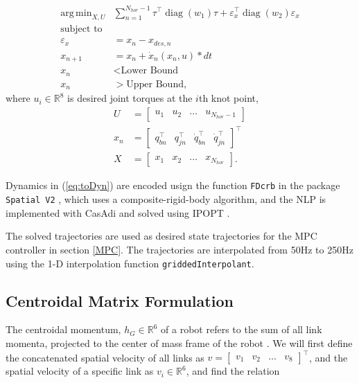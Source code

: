 \documentclass[conference]{IEEEtran}
\DeclareMathOperator*{\argmin}{arg\,min}
\DeclareMathOperator{\diag}{diag}
\begin{document}
\begin{align}
    \argmin_{X, U}& \sum^{N_{hor}-1}_{n=1} \tau^\top \diag(w_1) \tau + \varepsilon_x^\top \diag(w_2) \varepsilon_x \\
     \text{subject to} & \nonumber \\
     \varepsilon_x & = x_n - x_{des, n} \\
    x_{n+1} & =x_n + \dot{x}_n(x_n, u) * dt \label{eq:toDyn}\\
    x_n &< \text{Lower Bound} \\
    x_n &> \text{Upper Bound}, 
\end{align}
where $u_i \in \mathbb{R}^8$ is desired joint torques at the $i$th knot point, 
\begin{align}
    U &= \begin{bmatrix}
        u_1 & u_2 & \dots & u_{N_{hor}-1}
    \end{bmatrix} \\
    x_n &= \begin{bmatrix}
    q_{bn}^\top & q_{jn}^\top & \dot{q}_{bn}^\top & \dot{q}_{jn}^\top
\end{bmatrix}^\top\\
X &= \begin{bmatrix}
    x_1 & x_2 & \dots & x_{N_{hor}}
\end{bmatrix}.
\end{align}

Dynamics in (\ref{eq:toDyn}) are encoded usign the function \texttt{FDcrb} in the package \texttt{Spatial V2} \cite{spatialv2}, which uses a composite-rigid-body algorithm, and the NLP is implemented with CasAdi \cite{casadi} and solved using IPOPT \cite{ipopt}.

The solved trajectories are used as desired state trajectories for the MPC controller in section \ref{MPC}. The trajectories are interpolated from 50Hz to 250Hz using the 1-D interpolation function \texttt{griddedInterpolant}. 

\subsection{Centroidal Matrix Formulation}

The centroidal momentum, $h_G \in \mathbb{R}^6$ of a robot refers to the sum of all link momenta, projected to the center of mass frame of the robot \cite{orin2008centroidal}. We will first define the concatenated spatial velocity of all links as $v = \left[ \begin{matrix}
    v_1 & v_2 & \dots & v_8 \end{matrix}\right]^\top$, and the spatial velocity of a specific link as $v_i \in \mathbb{R}^6$, and find the relation
\end{document}
